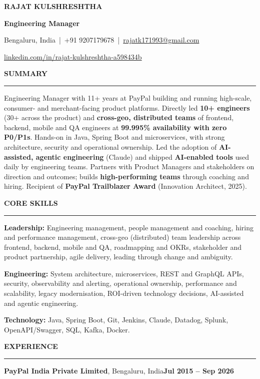 \documentclass[10pt,a4paper]{article}
\renewcommand{\normalsize}{\fontsize{10}{12.1}\selectfont}
\newcommand{\bd}[1]{\textbf{#1}}
\newcommand{\sect}[1]{%
  \par\vspace{8pt}%
  {\bfseries\fontsize{10.8}{12.5}\selectfont #1}\par\nointerlineskip
  \vspace{1.5pt}\noindent\rule{\linewidth}{0.6pt}\par\vspace{4pt}}
\newcommand{\company}[3]{%
  \par\vspace{1pt}\noindent\textbf{#1}, #2\hfill\textbf{#3}\par\nopagebreak}
\begin{document}
\normalsize

\centerline{\bfseries\fontsize{17}{19}\selectfont RAJAT KULSHRESHTHA}
\vspace{2pt}
\centerline{\bfseries\fontsize{11}{13}\selectfont Engineering Manager}
\vspace{3pt}
\centerline{Bengaluru, India \,|\, +91 9207179678 \,|\,
  \href{mailto:rajatk171993@gmail.com}{rajatk171993@gmail.com}}
\vspace{1.5pt}
\centerline{\href{https://www.linkedin.com/in/rajat-kulshreshtha-a598434b/}{linkedin.com/in/rajat-kulshreshtha-a598434b}}

\sect{SUMMARY}
Engineering Manager with 11+ years at PayPal building and running high-scale, consumer- and
merchant-facing product platforms. Directly led \bd{10+ engineers} (30+ across the product) and
\bd{cross-geo, distributed teams} of frontend, backend, mobile and QA engineers at
\bd{99.995\% availability with zero P0/P1s}.
Hands-on in Java, Spring Boot and microservices, with strong architecture, security and
operational ownership. Led the adoption of \bd{AI-assisted, agentic engineering} (Claude) and
shipped \bd{AI-enabled tools} used daily by engineering teams. Partners with Product Managers and
stakeholders on direction and outcomes; builds \bd{high-performing teams} through coaching and
hiring. Recipient of \bd{PayPal Trailblazer Award} (Innovation Architect, 2025).

\sect{CORE SKILLS}
\textbf{Leadership:} Engineering management, people management and coaching, hiring and
performance management, cross-geo (distributed) team leadership across frontend, backend,
mobile and QA, roadmapping and OKRs, stakeholder and
product partnership, agile delivery, leading through change and ambiguity.\par\vspace{2pt}
\textbf{Engineering:} System architecture, microservices, REST and GraphQL APIs, security,
observability and alerting, operational ownership, performance and scalability, legacy
modernisation, ROI-driven technology decisions, AI-assisted and agentic engineering.\par\vspace{2pt}
\textbf{Technology:} Java, Spring Boot, Git, Jenkins, Claude, Datadog, Splunk, OpenAPI/Swagger, SQL, Kafka, Docker.

\sect{EXPERIENCE}
\company{PayPal India Private Limited}{Bengaluru, India}{Jul 2015 -- Sep 2026}
\end{document}
